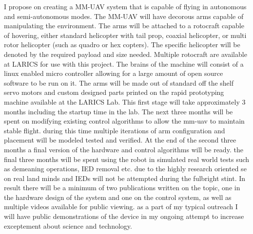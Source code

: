\documentclass[12pt]{article}
\begin{document}



I propose on creating a MM-UAV system that is capable of flying in autonomous and semi-autonomous 
modes.  The MM-UAV will have decorous arms capable of manipulating the environment.  The arms 
will be attached to a rotocraft capable of hovering, either standard helicopter with tail prop, coaxial 
helicopter, or multi rotor helicopter (such as quadro or hex copters).  The specific helicopter will be 
denoted by the required payload and size needed.  Multiple rotocraft are available at LARICS for use 
with this project.  The brains of the machine will consist of a linux enabled micro controller allowing for 
a large amount of open source software to be run on it.  The arms will be made out of standard off the 
shelf servo motors and custom designed parts printed on the rapid prototyping machine available at 
the LARICS Lab.  This first stage will take approximately 3 months including the startup time in the lab.  
The next three months will be spent on modifying existing control algorithms to allow the mm-uav to 
maintain stable flight.  during this time multiple iterations of arm configuration and placement will be 
modeled tested and verified.  At the end of the second three months a final version of the hardware and 
control algorithms will be ready.  the final three months will be spent using the robot in simulated real 
world tests such as demeaning operations, IED removal etc.  due to the highly research oriented se on 
real land minds and IEDs will not be attempted during the fulbright stint.  In result there will be a 
minimum of two publications written on the topic, one in the hardware design of the system and one on 
the control system, as well as multiple videos available for public viewing.  as a part of my typical 
outreach I will have public demonstrations of the device in my ongoing attempt to increase 
exceptement about science and technology.  
\end{document}

